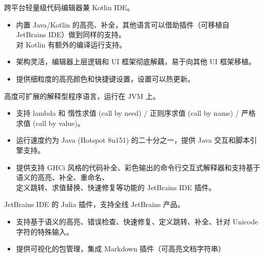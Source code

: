 \documentclass{resume}
\begin{document}
跨平台轻量级代码编辑器兼 Kotlin IDE。
\begin{itemize}
  \item 内置 Java/Kotlin 的高亮、补全，其他语言可以借助插件（可移植自 JetBrains IDE）做到同样的支持。 \\ 对 Kotlin 有额外的编译运行支持。
  \item 架构灵活，编辑器上层逻辑和 UI 框架彻底解藕，易于向其他 UI 框架移植。
  \item 提供细粒度的高亮颜色和快捷键设置，设置可以热更新。
\end{itemize}

高度可扩展的解释型程序语言，运行在 JVM 上。
\begin{itemize}
  \item 支持 lambda 和 惰性求值 (call by need) / 正则序求值 (call by name) / 严格求值 (call by value)。
  \item 运行速度约为 Java (Hotspot 8u151) 的二十分之一，提供 Java 交互和脚本引擎支持。
  \item 提供支持 GHCi 风格的代码补全、彩色输出的命令行交互式解释器和支持基于语义的高亮、补全、重命名、 \\ 定义跳转、求值替换、快速修复等功能的 JetBrains IDE 插件。
\end{itemize}

JetBrains IDE 的 Julia 插件，支持全线 JetBrains 产品。
\begin{itemize}
  \item 支持基于语义的高亮、错误检查、快速修复、定义跳转、补全、针对 Unicode 字符的特殊输入。
  \item 提供可视化的包管理，集成 Markdown 插件（可高亮文档字符串）
\end{itemize}


\end{document}
